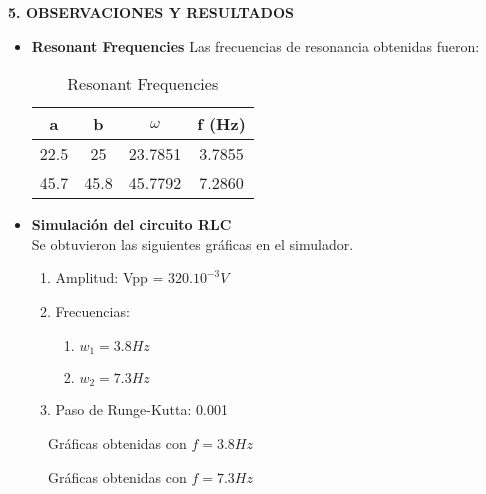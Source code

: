 \documentclass[10pt,a4paper]{article}
\begin{document}
\begin{multicols}{2}
\begin{center}
{\large \bf 5. OBSERVACIONES Y RESULTADOS}
\end{center}
\begin{itemize}
\item \textbf{Resonant Frequencies}
Las frecuencias de resonancia obtenidas fueron:\\
\begin{table}[H]
\centering
\begin{tabular}{|c|c|c|c|}
\hline
\textbf{a} & \textbf{b} & \textbf{$\omega$} & \textbf{f (Hz)} \\ \hline
22.5 & 25 & 23.7851 & 3.7855 \\ \hline
45.7 & 45.8 & 45.7792 & 7.2860 \\ \hline
\end{tabular}
\caption{Resonant Frequencies}
\end{table}
\item \textbf{Simulación del circuito RLC}\\
Se obtuvieron las siguientes gráficas en el simulador.
\begin{enumerate}
\item Amplitud: Vpp = $320.10^{-3} V$
\item Frecuencias: 
\begin{enumerate}
\item $w_1 = 3.8Hz$
\item $w_2 = 7.3Hz$
\end{enumerate}
\item Paso de Runge-Kutta: 0.001
\end{enumerate}
\end{itemize}
\end{multicols}
\begin{figure}[H]
\centering
{}
\quad
{}
\quad
{}
\caption{Gráficas obtenidas con $f = 3.8Hz$}
\label{Figura 2}
\end{figure}

\begin{figure}[H]
\centering
{}
\quad
{}
\quad
{}
\caption{Gráficas obtenidas con $f = 7.3Hz$}
\label{Figura 3}
\end{figure}
\end{document}
